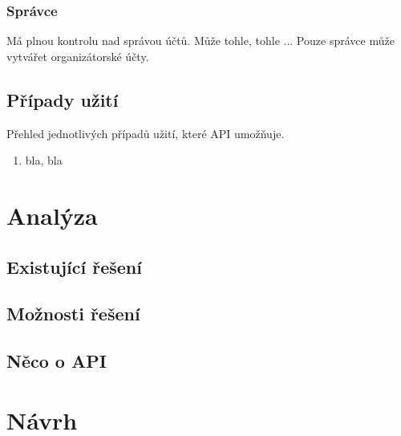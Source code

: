 \documentclass[thesis=B,czech]{FITthesis}[2012/06/26]
\begin{document}
\subsection{Správce}

\indent

Má plnou kontrolu nad správou účtů. Může tohle, tohle ... Pouze správce může vytvářet organizátorské účty.

\section{Případy užití}


Přehled jednotlivých případů užití, které API umožňuje.

\begin{enumerate}
\item bla, bla
\end{enumerate}

\chapter{Analýza}

\section{Existující řešení}


\section{Možnosti řešení}


\section{Něco o API}


\chapter{Návrh}
\end{document}
